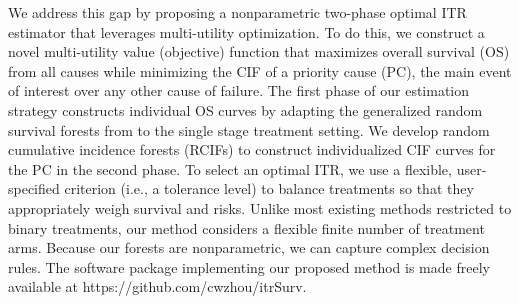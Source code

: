 We address this gap by proposing a nonparametric two-phase optimal ITR estimator that leverages multi-utility optimization. To do this, we construct a novel multi-utility value (objective) function that maximizes overall survival (OS) from all causes while minimizing the CIF of a priority cause (PC), the main event of interest over any other cause of failure. The first phase of our estimation strategy constructs individual OS curves by adapting the generalized random survival forests from \cite{cho_multi-stage_2023} to the single stage treatment setting. We develop random cumulative incidence forests (RCIFs) to construct individualized CIF curves for the PC in the second phase. To select an optimal ITR, we use a flexible, user-specified criterion (i.e., a tolerance level) to balance treatments so that they appropriately weigh survival and risks. Unlike most existing methods restricted to binary treatments, our method considers a flexible finite number of treatment arms. Because our forests are nonparametric, we can capture complex decision rules. \ifnum{}\else The software package implementing our proposed method is made freely available at https://github.com/cwzhou/itrSurv.\fi

